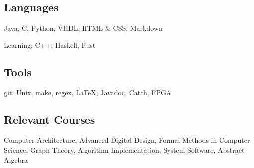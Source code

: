 \documentclass[18pt]{article}
\begin{document}
  \subsection*{Languages}\label{languages}
  Java,
  C,
  Python,
  VHDL,
  HTML \& CSS,
  Markdown
  
  Learning: C++, Haskell, Rust
  
  \subsection*{Tools}\label{tools}
  git,
  Unix,
  make,
  regex,
  \LaTeX,
  Javadoc,
  Catch,
  FPGA
  
  \subsection*{Relevant Courses}\label{relevant-courses}
      Computer Architecture,
      Advanced Digital Design,
      Formal Methods in Computer Science,
      Graph Theory,
      Algorithm Implementation,
      System Software,
      Abstract Algebra
    
\end{document}
